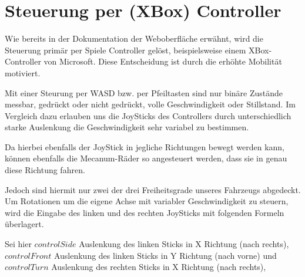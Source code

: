 \begin{table}[ht]
	\centering
\caption{Binäres Protokoll} 
\label{table:protokoll}
\end{table} 



\section{Steuerung per (XBox) Controller}
Wie bereits in der Dokumentation der Weboberfläche erwähnt, wird die Steuerung primär per Spiele Controller gelöst, beispielsweise einem XBox-Controller von Microsoft.
Diese Entscheidung ist durch die erhöhte Mobilität motiviert. 

Mit einer Steurung per WASD bzw. per Pfeiltasten sind nur binäre Zustände messbar, gedrückt oder nicht gedrückt, volle Geschwindigkeit oder Stillstand.
Im Vergleich dazu erlauben uns die JoySticks des Controllers durch unterschiedlich starke Auslenkung die Geschwindigkeit sehr variabel zu bestimmen.

Da hierbei ebenfalls der JoyStick in jegliche Richtungen bewegt werden kann, können ebenfalls die Mecanum-Räder so angesteuert werden, dass sie in genau diese Richtung fahren.

Jedoch sind hiermit nur zwei der drei Freiheitsgrade unseres Fahrzeugs abgedeckt. Um Rotationen um die eigene Achse mit variabler Geschwindigkeit zu steuern, wird die Eingabe des linken und des rechten JoySticks mit folgenden Formeln überlagert.

\bigskip
Sei hier $controlSide$ Auslenkung des linken Sticks in X Richtung (nach rechts), 
$controlFront$ Auslenkung des linken Sticks in Y Richtung (nach vorne) und 
$controlTurn$ Auslenkung des rechten Sticks in X Richtung (nach rechts), 

